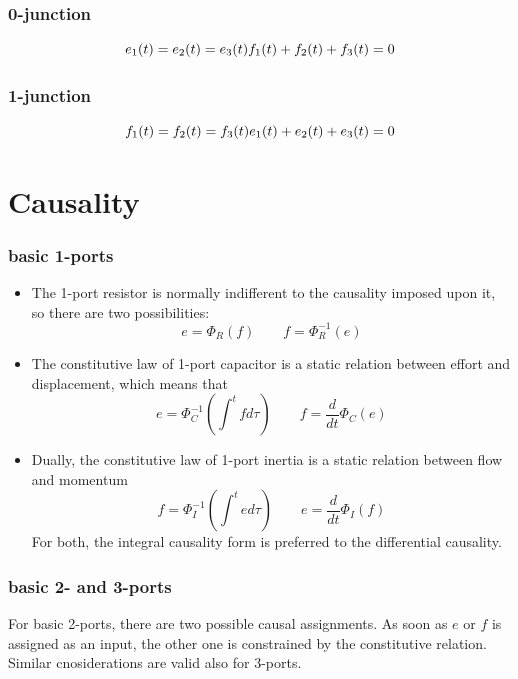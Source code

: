 \documentclass{book}
\begin{document}
\subsubsection{0-junction}
\[
    e_1(t)=e_2(t)=e_3(t)\\
    f_1(t)+f_2(t)+f_3(t)=0
\]
\subsubsection{1-junction}
\[
    f_1(t)=f_2(t)=f_3(t)\\
    e_1(t)+e_2(t)+e_3(t)=0
\]

\section{Causality}
\subsubsection{basic 1-ports}
\begin{itemize}
    \item The 1-port resistor is normally indifferent to the causality imposed upon it, so there are two possibilities: 
        \[
            e = \Phi_R(f) \qquad f = \Phi_R^{-1}(e)
        \]
    \item The constitutive law of 1-port capacitor is a static relation between effort and displacement, which means that 
        \[
            e = \Phi_C^{-1}(\int_{}^{t}fd\tau) \qquad f = \displaystyle\frac{d}{dt}\Phi_C(e)
        \]
    \item Dually, the constitutive law of 1-port inertia is a static relation between flow and momentum
        \[
            f = \Phi_I^{-1}(\int_{}^{t}ed\tau) \qquad e = \displaystyle\frac{d}{dt}\Phi_I(f)
        \]
        For both, the integral causality form is preferred to the differential causality.
\end{itemize}
\subsubsection{basic 2- and 3-ports}
For basic 2-ports, there are two possible causal assignments. As soon as $e$ or $f$ is assigned as an input, the other one is constrained by the constitutive relation. Similar cnosiderations are valid also for 3-ports.
\end{document}
